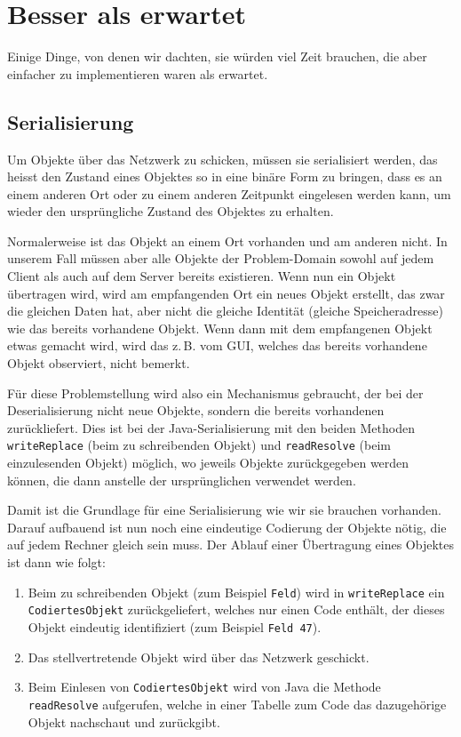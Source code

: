 \documentclass[12pt,halfparskip]{scrartcl}
\begin{document}
\clearpage
\section{Besser als erwartet}

Einige Dinge, von denen wir dachten, sie würden viel Zeit brauchen, die aber einfacher zu implementieren waren als erwartet.

\subsection{Serialisierung}

Um Objekte über das Netzwerk zu schicken, müssen sie serialisiert werden, das heisst den Zustand eines Objektes so in eine binäre Form zu bringen, dass es an einem anderen Ort oder zu einem anderen Zeitpunkt eingelesen werden kann, um wieder den ursprüngliche Zustand des Objektes zu erhalten.

Normalerweise ist das Objekt an einem Ort vorhanden und am anderen nicht. In unserem Fall müssen aber alle Objekte der Problem-Domain sowohl auf jedem Client als auch auf dem Server bereits existieren. Wenn nun ein Objekt übertragen wird, wird am empfangenden Ort ein neues Objekt erstellt, das zwar die gleichen Daten hat, aber nicht die gleiche Identität (gleiche Speicheradresse) wie das bereits vorhandene Objekt. Wenn dann mit dem empfangenen Objekt etwas gemacht wird, wird das z.\,B. vom GUI, welches das bereits vorhandene Objekt observiert, nicht bemerkt.

Für diese Problemstellung wird also ein Mechanismus gebraucht, der bei der Deserialisierung nicht neue Objekte, sondern die bereits vorhandenen zurückliefert. Dies ist bei der Java-Serialisierung mit den beiden Methoden \texttt{writeReplace} (beim zu schreibenden Objekt) und \texttt{readResolve} (beim einzulesenden Objekt) möglich, wo jeweils Objekte zurückgegeben werden können, die dann anstelle der ursprünglichen verwendet werden.

Damit ist die Grundlage für eine Serialisierung wie wir sie brauchen vorhanden. Darauf aufbauend ist nun noch eine eindeutige Codierung der Objekte nötig, die auf jedem Rechner gleich sein muss. Der Ablauf einer Übertragung eines Objektes ist dann wie folgt:

\begin{enumerate}
	\item Beim zu schreibenden Objekt (zum Beispiel \texttt{Feld}) wird in \texttt{writeReplace} ein \texttt{CodiertesObjekt} zurückgeliefert, welches nur einen Code enthält, der dieses Objekt eindeutig identifiziert (zum Beispiel \texttt{Feld 47}).
	\item Das stellvertretende Objekt wird über das Netzwerk geschickt.
	\item Beim Einlesen von \texttt{CodiertesObjekt} wird von Java die Methode \texttt{readResolve} aufgerufen, welche in einer Tabelle zum Code das dazugehörige Objekt nachschaut und zurückgibt.
\end{enumerate}
\end{document}
